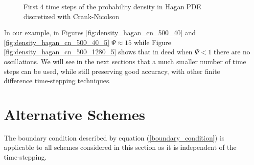 \documentclass[]{rAMF2e}
\begin{document}
\begin{figure}[htb]
  \begin{center}  
  \end{center}
     \caption{\label{fig:density_hagan_500_40_5} First 4 time steps of the probability density in Hagan PDE discretized with Crank-Nicolson}
\end{figure}

In our example, in Figures \ref{fig:density_hagan_cn_500_40} and \ref{fig:density_hagan_cn_500_40_5} $\Psi \approx 15$ while Figure \ref{fig:density_hagan_cn_500_1280_5} shows that in deed when $\Psi < 1$ there are no oscillations. We will see in the next sections that a much smaller number of time steps can be used, while still preserving good accuracy, with other finite difference time-stepping techniques.

\section{Alternative Schemes}
The boundary condition described by equation (\ref{boundary_condition}) is applicable to all schemes considered in this section as it is independent of the time-stepping.
\end{document}
